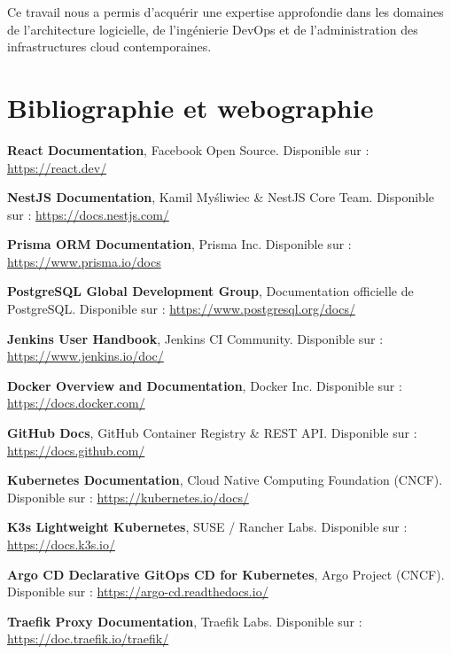 \documentclass[12pt,a4paper,oneside]{report}
\begin{document}
Ce travail nous a permis d'acquérir une expertise approfondie dans les domaines de l'architecture logicielle, de l'ingénierie DevOps et de l'administration des infrastructures cloud contemporaines.

\clearpage

\chapter*{Bibliographie et webographie}

\begin{enumerate}[label={[\arabic*]}]
    \item \textbf{React Documentation}, Facebook Open Source. Disponible sur : \url{https://react.dev/}
    \item \textbf{NestJS Documentation}, Kamil Myśliwiec \& NestJS Core Team. Disponible sur : \url{https://docs.nestjs.com/}
    \item \textbf{Prisma ORM Documentation}, Prisma Inc. Disponible sur : \url{https://www.prisma.io/docs}
    \item \textbf{PostgreSQL Global Development Group}, Documentation officielle de PostgreSQL. Disponible sur : \url{https://www.postgresql.org/docs/}
    \item \textbf{Jenkins User Handbook}, Jenkins CI Community. Disponible sur : \url{https://www.jenkins.io/doc/}
    \item \textbf{Docker Overview and Documentation}, Docker Inc. Disponible sur : \url{https://docs.docker.com/}
    \item \textbf{GitHub Docs}, GitHub Container Registry \& REST API. Disponible sur : \url{https://docs.github.com/}
    \item \textbf{Kubernetes Documentation}, Cloud Native Computing Foundation (CNCF). Disponible sur : \url{https://kubernetes.io/docs/}
    \item \textbf{K3s Lightweight Kubernetes}, SUSE / Rancher Labs. Disponible sur : \url{https://docs.k3s.io/}
    \item \textbf{Argo CD Declarative GitOps CD for Kubernetes}, Argo Project (CNCF). Disponible sur : \url{https://argo-cd.readthedocs.io/}
    \item \textbf{Traefik Proxy Documentation}, Traefik Labs. Disponible sur : \url{https://doc.traefik.io/traefik/}

\end{enumerate}
\end{document}
